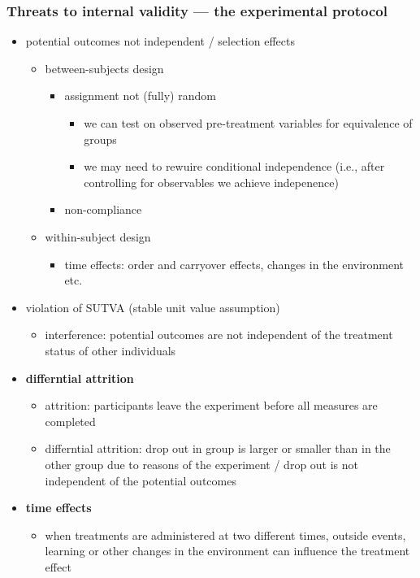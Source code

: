\documentclass[10pt]{article}
\begin{document}
\subsubsection{Threats to internal validity --- the experimental protocol}
\begin{itemize}
    \item potential outcomes not independent / selection effects 
    \begin{itemize}
        \item between-subjects design 
        \begin{itemize}
            \item assignment not (fully) random 
            \begin{itemize}
                \item we can test on observed pre-treatment variables for equivalence of groups 
                \item we may need to rewuire conditional independence (i.e., after controlling for observables we achieve indepenence)
            \end{itemize}
            \item non-compliance
        \end{itemize}
        \item within-subject design 
        \begin{itemize}
            \item time effects: order and carryover effects, changes in the environment etc. 
        \end{itemize}
    \end{itemize}
    \item violation of SUTVA (stable unit value assumption)
    \begin{itemize}
        \item interference: potential outcomes are not independent of the treatment status of other individuals 
    \end{itemize}
    \item \textbf{differntial attrition}
    \begin{itemize}
        \item attrition: participants leave the experiment before all measures are completed 
        \item differntial attrition: drop out in group is larger or smaller than in the other group due to reasons of the experiment / drop out is not independent of the potential outcomes 
    \end{itemize}
    \item \textbf{time effects}
    \begin{itemize}
        \item when treatments are administered at two different times, outside events, learning or other changes in the environment can influence the treatment effect
    \end{itemize}
\end{itemize}
\newpage 
\end{document}
